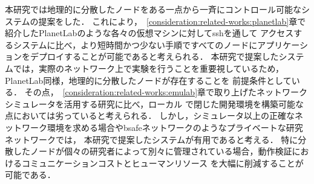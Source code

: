 本研究では地理的に分散したノードをある一点から一斉にコントロール可能なシステムの提案をした．
これにより，~\ref{consideration:related-works:planetlab}章で紹介したPlanetLabのような各々の仮想マシンに対してsshを通して
アクセスするシステムに比べ，より短時間かつ少ない手順ですべてのノードにアプリケーションをデプロイすることが可能であると考えられる．
本研究で提案したシステムでは，実際のネットワーク上で実験を行うことを重要視しているため，PlanetLab同様，地理的に分散したノードが存在することを
前提条件としている．
その点，~\ref{consideration:related-works:emulab}章で取り上げたネットワークシミュレータを活用する研究に比べ，ローカル
で閉じた開発環境を構築可能な点においては劣っていると考えられる．
しかし，シミュレータ以上の正確なネットワーク環境を求める場合やbsafeネットワークのようなプライベートな研究ネットワークでは，
本研究で提案したシステムが有用であると考える．
特に分散したノードが個々の研究者によって別々に管理されている場合，動作検証におけるコミュニケーションコストとヒューマンリソース
を大幅に削減することが可能である．

